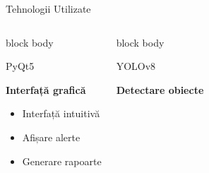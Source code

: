 \documentclass[aspectratio=169,9pt]{beamer}
\begin{document}
\begin{frame}{Tehnologii Utilizate}
\begin{columns}[T]
                        \begin{beamercolorbox}[rounded=true,shadow=true,sep=0.7em]{block body}
                                \begin{center}
                                        {\fontsize{18}{18}\selectfont\textcolor{mainblue}{PyQt5}}
                                        \vspace{0.1cm}
                                        
                                        \textbf{\small Interfață grafică}
                                        \vspace{0.1cm}
                                        
                                        \footnotesize
                                        \begin{itemize}[leftmargin=*]
                                                \setlength{\itemsep}{0pt}
                                                \item Interfață intuitivă
                                                \item Afișare alerte
                                                \item Generare rapoarte
                                        \end{itemize}
                                \end{center}
                        \end{beamercolorbox}
                        
                        \begin{beamercolorbox}[rounded=true,shadow=true,sep=0.7em]{block body}
                                \begin{center}
                                        {\fontsize{18}{18}\selectfont\textcolor{mainblue}{YOLOv8}}
                                        \vspace{0.1cm}
                                        
                                        \textbf{\small Detectare obiecte}
                                        \vspace{0.1cm}
                                        

\end{center}
\end{beamercolorbox}
\end{columns}
\end{frame}
\end{document}
